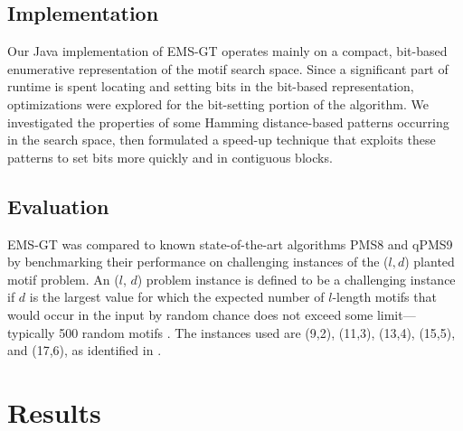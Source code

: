 \documentclass{acm_proc_article-sp}
\begin{document}
	\subsection{Implementation}
		Our Java implementation of EMS-GT operates mainly on a compact, bit-based enumerative representation of the motif search space. Since a significant part of runtime is spent locating and setting bits in the bit-based representation, optimizations were explored for the bit-setting portion of the algorithm. We investigated the properties of some Hamming distance-based patterns occurring in the search space, then formulated a speed-up technique that exploits these patterns to set bits more quickly and in contiguous blocks.

	\subsection{Evaluation}
		EMS-GT was compared to known state-of-the-art algorithms PMS8 and qPMS9 by benchmarking their performance on challenging instances of the ($l, d$) planted motif problem. An ($l$, $d$) problem instance is defined to be a challenging instance if $d$ is the largest value for which the expected number of $l$-length motifs that would occur in the input by random chance does not exceed some limit---typically 500 random motifs \cite{pms2015}. The instances used are (9,2), (11,3), (13,4), (15,5), and (17,6), as identified in \cite{pms2015,pms2007}. 
		\bigskip

\vspace{-3mm}		
\section{Results}
\end{document}
